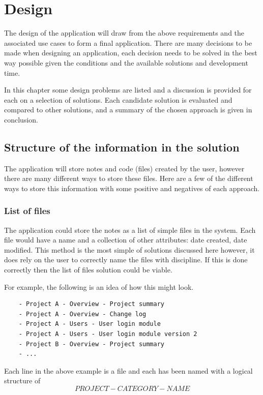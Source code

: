 \chapter{Design}\label{design}

The design of the application will draw from the above requirements and
the associated use cases to form a final application. There are many
decisions to be made when designing an application, each decision needs to be solved in the best way possible given the conditions and the available solutions and development time.

In this chapter some design problems are listed and a discussion is provided for each on a selection of solutions. Each candidate solution is evaluated and compared to other solutions, and a summary of the chosen approach is given in conclusion.

\section{Structure of the information in the solution}\label{structure-of-the-information-in-the-solution}

The application will store notes and code (files) created by the user, however
there are many different ways to store these files. Here are a few of the
different ways to store this information with some positive and negatives of each approach.

\subsection{List of files}\label{list-of-files}

The application could store the notes as a list of simple files in the system.
Each file would have a name and a collection of other attributes: date created,
date modified. This method is the most simple of solutions discussed here however, it does rely on the user to correctly name the files with discipline. If this is done correctly then the list of files solution could be viable.

For example, the following is an idea of how this might look.

\begin{verbatim}
    - Project A - Overview - Project summary
    - Project A - Overview - Change log
    - Project A - Users - User login module
    - Project A - Users - User login module version 2
    - Project B - Overview - Project summary
    - ...
\end{verbatim}
Each line in the above example is a file and each has been named with a logical structure of $$ PROJECT - CATEGORY - NAME $$

